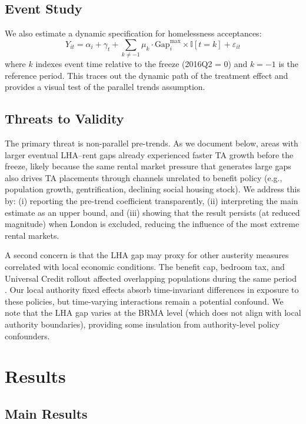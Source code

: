 \documentclass[12pt]{article}
\newcommand{\ind}{\mathbb{I}}
\begin{document}
\subsection{Event Study}

We also estimate a dynamic specification for homelessness acceptances:
\begin{equation}
Y_{it} = \alpha_i + \gamma_t + \sum_{k \neq -1} \mu_k \cdot \text{Gap}^{\max}_{i} \times \ind[t = k] + \varepsilon_{it}
\label{eq:event}
\end{equation}
where $k$ indexes event time relative to the freeze (2016Q2 = 0) and $k = -1$ is the reference period. This traces out the dynamic path of the treatment effect and provides a visual test of the parallel trends assumption.

\subsection{Threats to Validity}

The primary threat is non-parallel pre-trends. As we document below, areas with larger eventual LHA--rent gaps already experienced faster TA growth before the freeze, likely because the same rental market pressure that generates large gaps also drives TA placements through channels unrelated to benefit policy (e.g., population growth, gentrification, declining social housing stock). We address this by: (i) reporting the pre-trend coefficient transparently, (ii) interpreting the main estimate as an upper bound, and (iii) showing that the result persists (at reduced magnitude) when London is excluded, reducing the influence of the most extreme rental markets.

A second concern is that the LHA gap may proxy for other austerity measures correlated with local economic conditions. The benefit cap, bedroom tax, and Universal Credit rollout affected overlapping populations during the same period \citep{beatty2014}. Our local authority fixed effects absorb time-invariant differences in exposure to these policies, but time-varying interactions remain a potential confound. We note that the LHA gap varies at the BRMA level (which does not align with local authority boundaries), providing some insulation from authority-level policy confounders.


\section{Results}

\subsection{Main Results}
\end{document}
